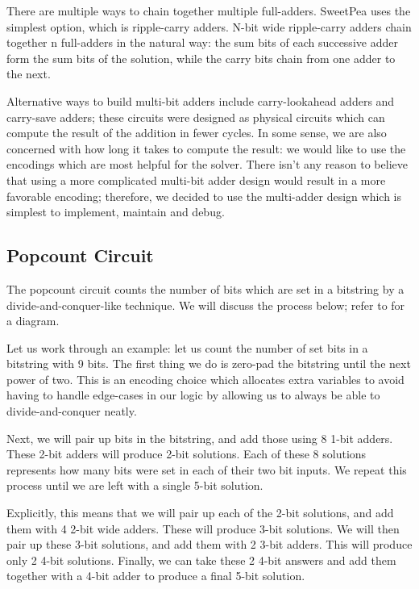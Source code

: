 There are multiple ways to chain together multiple full-adders. SweetPea uses the simplest option, which is ripple-carry adders. N-bit wide ripple-carry adders chain together n full-adders in the natural way: the sum bits of each successive adder form the sum bits of the solution, while the carry bits chain from one adder to the next.

Alternative ways to build multi-bit adders include carry-lookahead adders and carry-save adders; these circuits were designed as physical circuits which can compute the result of the addition in fewer cycles. In some sense, we are also concerned with how long it takes to compute the result: we would like to use the encodings which are most helpful for the solver. There isn't any reason to believe that using a more complicated multi-bit adder design would result in a more favorable encoding; therefore, we decided to use the multi-adder design which is simplest to implement, maintain and debug.

\subsection{Popcount Circuit}

The popcount circuit counts the number of bits which are set in a bitstring by a divide-and-conquer-like technique. We will discuss the process below; refer to  for a diagram.

Let us work through an example: let us count the number of set bits in a bitstring with 9 bits. The first thing we do is zero-pad the bitstring until the next power of two. This is an encoding choice which allocates extra variables to avoid having to handle edge-cases in our logic by allowing us to always be able to divide-and-conquer neatly.

Next, we will pair up bits in the bitstring, and add those using 8 1-bit adders. These 2-bit adders will produce 2-bit solutions. Each of these 8 solutions represents how many bits were set in each of their two bit inputs. We repeat this process until we are left with a single 5-bit solution.

Explicitly, this means that we will pair up each of the 2-bit solutions, and add them with 4 2-bit wide adders. These will produce 3-bit solutions. We will then pair up these 3-bit solutions, and add them with 2 3-bit adders. This will produce only 2 4-bit solutions. Finally, we can take these 2 4-bit answers and add them together with a 4-bit adder to produce a final 5-bit solution.

